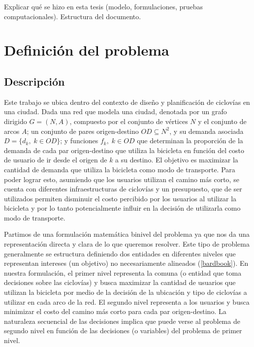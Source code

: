 \documentclass{article}
\begin{document}
  Explicar qué se hizo en esta tesis (modelo, formulaciones, pruebas computacionales). Estructura del documento.

  \section{Definición del problema}

  \subsection{Descripción}

  Este trabajo se ubica dentro del contexto de diseño y planificación de ciclovías en una ciudad. Dada una red que modela una ciudad, denotada por un grafo dirigido $G=(N,A)$, compuesto por el conjunto de vértices $N$ y el conjunto de arcos $A$; un conjunto de pares origen-destino $OD \subseteq N^2$, y su demanda asociada $D = \{d_k,\; k \in OD\}$; y funciones $f_k,\;k \in OD$ que determinan la proporción de la demanda de cada par origen-destino que utiliza la bicicleta en función del costo de usuario de ir desde el origen de $k$ a su destino. El objetivo es maximizar la cantidad de demanda que utiliza la bicicleta como modo de transporte. Para poder lograr esto, asumiendo que los usuarios utilizan el camino más corto, se cuenta con diferentes infraestructuras de ciclovías y un presupuesto, que de ser utilizados permiten disminuir el costo percibido por los usuarios al utilizar la bicicleta y por lo tanto potencialmente influir en la decisión de utilizarla como modo de transporte.

  Partimos de una formulación matemática binivel del problema ya que nos da una representación directa y clara de lo que queremos resolver. Este tipo de problema generalmente se estructura definiendo dos entidades en diferentes niveles que representan intereses (un objetivo) no necesariamente alineados (\ref{bardbook}). En nuestra formulación, el primer nivel representa la comuna (o entidad que toma decisiones sobre las ciclovías) y busca maximizar la cantidad de usuarios que utilizan la bicicleta por medio de la decisión de la ubicación y tipo de ciclovías a utilizar en cada arco de la red. El segundo nivel representa a los usuarios y busca minimizar el costo del camino más corto para cada par origen-destino. La naturaleza secuencial de las decisiones implica que puede verse al problema de segundo nivel en función de las decisiones (o variables) del problema de primer nivel.
\end{document}
